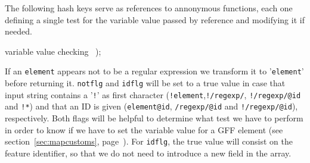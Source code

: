 \documentclass[11pt]{article}
\def\nwendcode{\endtrivlist \endgroup} %
\let\nwdocspar=\par                    %
\begin{document}
\nwenddocs{}\plusendmoddef
\nwendcode{}\nwdocspar

The following hash keys serve as references to annonymous functions, each one defining a single test for the variable value passed by reference and modifying it if needed.

\nwenddocs{}\plusendmoddef
    \LA{}variable value checking~{\nwtagstyle{}}\RA{}
    );
\nwendcode{}\nwdocspar


If an {\tt{}element} appears not to be a regular expression we transform it
to '{\tt{}{}element{}}' before returning it. {\tt{}{}not{}flg} and {\tt{}{}id{}flg}
will be set to a true value in case that input string contains a
'{\tt{}!}' as first character ({\tt{}!element},{\tt{}!/regexp/}, {\tt{}!/regexp/@id} and
{\tt{}!*}) and that an ID is given ({\tt{}element@id}, {\tt{}/regexp/@id} and
{\tt{}!/regexp/@id}), respectively. Both flags will be helpful to
determine what test we have to perform in order to know if we have to
set the variable value for a GFF element (see
section~\ref{sec:mapcustoms}, page~\pageref{sec:mapcustoms}). For
{\tt{}{}id{}flg}, the true value will consist on the feature identifier, so
that we do not need to introduce a new field in the array.
\end{document}

